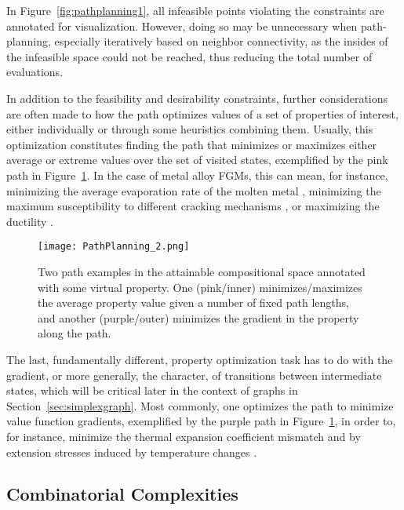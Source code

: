 In Figure~\ref{fig:pathplanning1}, all infeasible points violating the constraints are annotated for visualization. However, doing so may be unnecessary when path-planning, especially iteratively based on neighbor connectivity, as the insides of the infeasible space could not be reached, thus reducing the total number of evaluations. 


In addition to the feasibility and desirability constraints, further considerations are often made to how the path optimizes values of a set of properties of interest, either individually or through some heuristics combining them. Usually, this optimization constitutes finding the path that minimizes or maximizes either average or extreme values over the set of visited states, exemplified by the pink path in Figure~\ref{fig:pathplanning2}. In the case of metal alloy FGMs, this can mean, for instance, minimizing the average evaporation rate of the molten metal \cite{Mukherjee2016PrintabilityManufacturing}, minimizing the maximum susceptibility to different cracking mechanisms \cite{Yang2023DesignCracking}, or maximizing the ductility \cite{Hu2021ScreeningAlloys}.

\begin{figure}[H]
    \centering
    \texttt{[image: PathPlanning\_2.png]}
    \caption{Two path examples in the attainable compositional space annotated with some virtual property. One (pink/inner) minimizes/maximizes the average property value given a number of fixed path lengths, and another (purple/outer) minimizes the gradient in the property along the path.} 
    \label{fig:pathplanning2}
\end{figure}

The last, fundamentally different, property optimization task has to do with the gradient, or more generally, the character, of transitions between intermediate states, which will be critical later in the context of graphs in Section~\ref{sec:simplexgraph}. Most commonly, one optimizes the path to minimize value function gradients, exemplified by the purple path in Figure~\ref{fig:pathplanning2}, in order to, for instance, minimize the thermal expansion coefficient mismatch and by extension stresses induced by temperature changes \cite{Kirk2021ComputationalMonotonicity}.



\subsection{Combinatorial Complexities} \label{ssec:combinatorialcomplexities}

